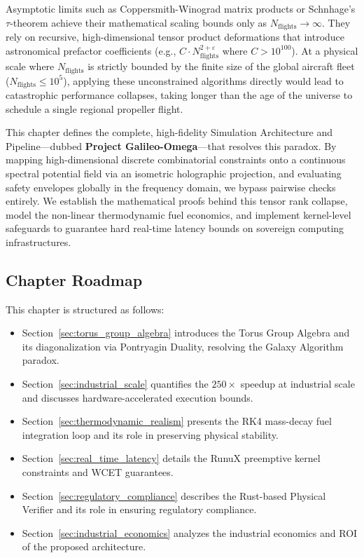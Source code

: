 \documentclass[11pt,a4paper]{book}
\begin{document}
Asymptotic limits such as Coppersmith-Winograd matrix products or Schnhage's $\tau$-theorem achieve their mathematical scaling bounds only as $N_{\text{flights}} \to \infty$. They rely on recursive, high-dimensional tensor product deformations that introduce astronomical prefactor coefficients (e.g., $C \cdot N_{\text{flights}}^{2+\varepsilon}$ where $C > 10^{100}$). At a physical scale where $N_{\text{flights}}$ is strictly bounded by the finite size of the global aircraft fleet ($N_{\text{flights}} \le 10^5$), applying these unconstrained algorithms directly would lead to catastrophic performance collapses, taking longer than the age of the universe to schedule a single regional propeller flight.

This chapter defines the complete, high-fidelity Simulation Architecture and Pipeline---dubbed \textbf{Project Galileo-Omega}---that resolves this paradox. By mapping high-dimensional discrete combinatorial constraints onto a continuous spectral potential field via an isometric holographic projection, and evaluating safety envelopes globally in the frequency domain, we bypass pairwise checks entirely. We establish the mathematical proofs behind this tensor rank collapse, model the non-linear thermodynamic fuel economics, and implement kernel-level safeguards to guarantee hard real-time latency bounds on sovereign computing infrastructures.

\subsection*{Chapter Roadmap}
This chapter is structured as follows:\\
\begin{itemize}
    \item Section~\ref{sec:torus_group_algebra} introduces the Torus Group Algebra and its diagonalization via Pontryagin Duality, resolving the Galaxy Algorithm paradox.
    \item Section~\ref{sec:industrial_scale} quantifies the $250\times$ speedup at industrial scale and discusses hardware-accelerated execution bounds.
    \item Section~\ref{sec:thermodynamic_realism} presents the RK4 mass-decay fuel integration loop and its role in preserving physical stability.
    \item Section~\ref{sec:real_time_latency} details the RunuX preemptive kernel constraints and WCET guarantees.
    \item Section~\ref{sec:regulatory_compliance} describes the Rust-based Physical Verifier and its role in ensuring regulatory compliance.
    \item Section~\ref{sec:industrial_economics} analyzes the industrial economics and ROI of the proposed architecture.
\end{itemize}
\end{document}
